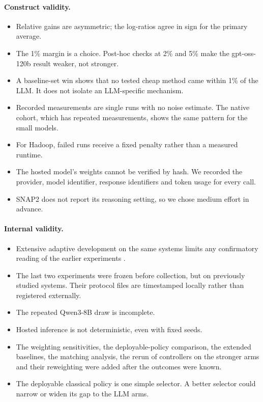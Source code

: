 \paragraph{Construct validity.}
\begin{itemize}
  \item Relative gains are asymmetric; the log-ratios agree in sign for the primary average.
  \item The 1\% margin is a choice. Post-hoc checks at 2\% and 5\% make the gpt-oss-120b result weaker, not stronger.
  \item A baseline-set win shows that no tested cheap method came within 1\% of the LLM. It does not isolate an LLM-specific mechanism.
  \item Recorded measurements are single runs with no noise estimate. The native cohort, which has repeated measurements, shows the same pattern for the small models.
  \item For Hadoop, failed runs receive a fixed penalty rather than a measured runtime.
  \item The hosted model's weights cannot be verified by hash. We recorded the provider, model identifier, response identifiers and token usage for every call.
  \item SNAP2 does not report its reasoning setting, so we chose medium effort in advance.
\end{itemize}

\paragraph{Internal validity.}
\begin{itemize}
  \item Extensive adaptive development on the same systems limits any confirmatory reading of the earlier experiments \cite{gelman2014forking}.
  \item The last two experiments were frozen before collection, but on previously studied systems. Their protocol files are timestamped locally rather than registered externally.
  \item The repeated Qwen3-8B draw is incomplete.
  \item Hosted inference is not deterministic, even with fixed seeds.
  \item The weighting sensitivities, the deployable-policy comparison, the extended baselines, the matching analysis, the rerun of controllers on the stronger arms and their reweighting were added after the outcomes were known.
  \item The deployable classical policy is one simple selector. A better selector could narrow or widen its gap to the LLM arms.
\end{itemize}

